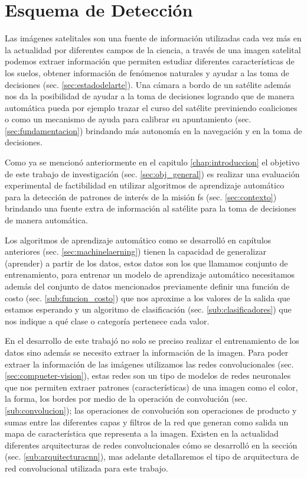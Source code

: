 \chapter{Esquema de Detección}\label{chap:tbd}

Las imágenes satelitales son una fuente de información utilizadas cada vez más en la actualidad por diferentes campos de la ciencia, a través de una imagen satelital podemos extraer información que permiten estudiar diferentes características de los suelos, obtener información de fenómenos naturales y ayudar a las toma de decisiones (sec. \ref{sec:estadodelarte}). Una cámara a bordo de un satélite además nos da la posibilidad de ayudar a la toma de decisiones logrando que de manera automática pueda por ejemplo trazar el curso del satélite previniendo coaliciones o como un mecanismo de ayuda para calibrar su apuntamiento (sec. \ref{sec:fundamentacion}) brindando más autonomía en la navegación y en la toma de decisiones. 

Como ya se mencionó anteriormente en el  capitulo \ref{chap:introduccion} el objetivo de este trabajo de investigación  (sec. \ref{sec:obj_general}) es realizar una evaluación experimental de factibilidad en utilizar algoritmos de aprendizaje automático para  la detección de patrones de interés de la misión \ac{fs} (sec. \ref{sec:contexto})  brindando una  fuente extra de información al satélite para la toma de decisiones de manera automática. 

Los algoritmos de aprendizaje automático como se desarrolló en capítulos anteriores (sec. \ref{sec:machinelaerning}) tienen la capacidad de generalizar (aprender)  a partir de los datos, estos datos son los que llamamos conjunto de entrenamiento, para entrenar un modelo de aprendizaje automático necesitamos además del conjunto de datos mencionados previamente definir una función de costo (sec. \ref{sub:funcion_costo}) que nos aproxime a los valores de la salida que estamos esperando y un algoritmo de clasificación (sec. \ref{sub:clasificadores}) que nos indique a qué clase o categoría pertenece cada valor. 

En el desarrollo de este trabajó no solo se preciso realizar el entrenamiento de los datos sino además se necesito extraer la información de la imagen. Para poder extraer la información de las imágenes utilizamos las redes convolucionales (sec. \ref{sec:compueter-vision}), estas redes son un tipo de modelos de redes neuronales que nos permiten extraer patrones (características) de una imagen como el color, la forma, los bordes por medio de la operación de convolución (sec. \ref{sub:convolucion}); las operaciones de convolución son operaciones de producto y sumas entre las diferentes capas y filtros de la red que generan como salida un mapa de característica que representa a la imagen. Existen en la actualidad diferentes arquitecturas de redes convolucionales cómo se desarrolló en la sección (sec. \ref{sub:arquitecturacnn}), mas adelante  detallaremos el tipo de arquitectura de red convolucional utilizada para este trabajo.

